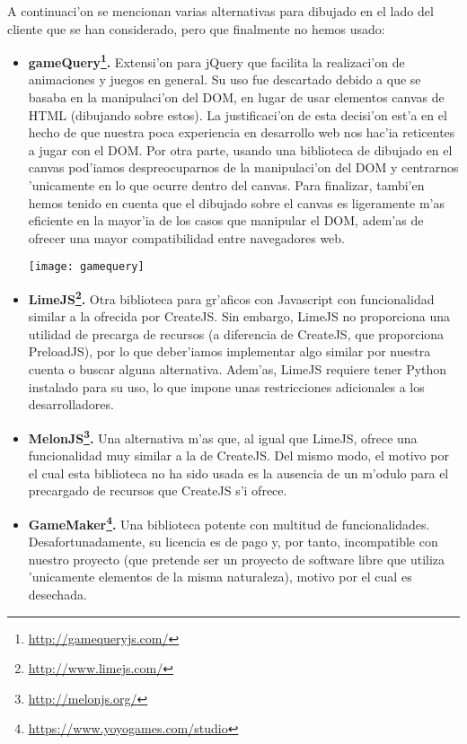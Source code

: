 A continuaci'on se mencionan varias alternativas para dibujado en el lado del cliente que se han
considerado, pero que finalmente no hemos usado:

\begin{itemize}
\item \textbf{gameQuery\footnote{\url{http://gamequeryjs.com/}}.} Extensi'on para jQuery que facilita la realizaci'on 
de animaciones y juegos en general. Su uso fue descartado debido a que se basaba en la manipulaci'on
del DOM, en lugar de usar elementos canvas de HTML (dibujando sobre estos). 
La justificaci'on de esta decisi'on est'a en el hecho de que nuestra poca experiencia en
desarrollo web nos hac'ia reticentes a jugar con el DOM. Por otra parte, usando una biblioteca
de dibujado en el canvas pod'iamos despreocuparnos de  la manipulaci'on del DOM y centrarnos
'unicamente en lo que ocurre dentro del canvas.
Para finalizar, tambi'en hemos tenido en cuenta que el dibujado sobre el canvas es ligeramente
m'as eficiente en la mayor'ia de los casos que manipular el DOM, adem'as de ofrecer una mayor
compatibilidad entre navegadores web.

\begin{center}
\texttt{[image: gamequery]}
\end{center}

\item \textbf{LimeJS\footnote{\url{http://www.limejs.com/}}.} Otra biblioteca para gr'aficos con Javascript con funcionalidad similar a la 
ofrecida por CreateJS. Sin embargo, LimeJS no proporciona una utilidad de precarga de recursos 
(a diferencia de CreateJS, que proporciona PreloadJS), por lo que deber'iamos implementar algo
similar por nuestra cuenta o buscar alguna alternativa. Adem'as, LimeJS requiere tener Python
instalado para su uso, lo que impone unas restricciones adicionales a los desarrolladores.
\item \textbf{MelonJS\footnote{\url{http://melonjs.org/}}.} Una alternativa m'as que, al igual que LimeJS, ofrece una funcionalidad muy similar
a la de CreateJS. Del mismo modo, el motivo por el cual esta biblioteca no ha sido usada es la 
ausencia de un m'odulo para el precargado de recursos que CreateJS s'i ofrece.
\item \textbf{GameMaker\footnote{\url{https://www.yoyogames.com/studio}}.} Una biblioteca potente con multitud de funcionalidades. Desafortunadamente, su
licencia es de pago y, por tanto, incompatible con nuestro proyecto (que pretende ser un proyecto
de software libre que utiliza 'unicamente elementos de la misma naturaleza), motivo por el cual 
es desechada.
\end{itemize}

